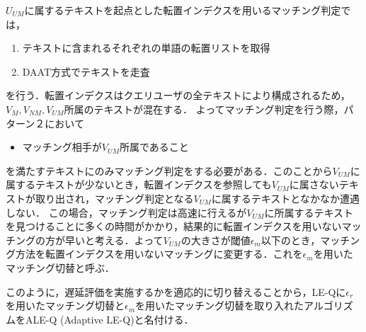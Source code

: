 $U_{UM}$に属するテキストを起点とした転置インデクスを用いるマッチング判定では，
\begin{enumerate}
    \item テキストに含まれるそれぞれの単語の転置リストを取得
    \item DAAT方式でテキストを走査
\end{enumerate}
を行う．転置インデクスはクエリユーザの全テキストにより構成されるため，$V_M, V_{NM}, V_{UM}$所属のテキストが混在する．
よってマッチング判定を行う際，パターン２において
\begin{itemize}
    \item マッチング相手が$V_{UM}$所属であること
\end{itemize}
を満たすテキストにのみマッチング判定をする必要がある．このことから$V_{UM}$に属するテキストが少ないとき，転置インデクスを参照しても$V_{UM}$に属さないテキストが取り出され，マッチング判定となる$V_{UM}$に属するテキストとなかなか遭遇しない．
この場合，マッチング判定は高速に行えるが$V_{UM}$に所属するテキストを見つけることに多くの時間がかかり，結果的に転置インデクスを用いないマッチングの方が早いと考える．よって$V_{UM}$の大きさが閾値$\epsilon_m$以下のとき，マッチング方法を転置インデクスを用いないマッチングに変更する．これを$\epsilon_m$を用いたマッチング切替と呼ぶ．

このように，遅延評価を実施するかを適応的に切り替えることから，LE-Qに$\epsilon_r$を用いたマッチング切替と$\epsilon_m$を用いたマッチング切替を取り入れたアルゴリズムをALE-Q (Adaptive LE-Q)と名付ける．